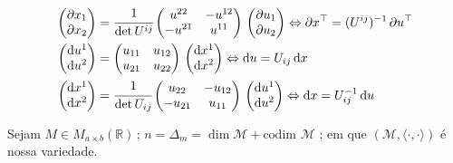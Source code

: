 \documentclass[12pt]{article}
\begin{document}
\begin{align}
  \left( \begin{matrix} \partial x_1 \\ \partial x_2 \end{matrix} \right) &= \cfrac{1}{\det U^{ij}} \left( \begin{matrix} u^{22} & -u^{12} \\ -u^{21} & u^{11} \end{matrix} \right) \, \left( \begin{matrix} \partial u_1 \\ \partial u_2 \end{matrix} \right) \Leftrightarrow \partial x^\top = (U^{ij})^{-1} \, \partial u^\top \\
  \left( \begin{matrix} \mathrm{d} u^1 \\ \mathrm{d} u^2 \end{matrix} \right) &= \left( \begin{matrix} u_{11} & u_{12} \\ u_{21} & u_{22} \end{matrix} \right) \, \left( \begin{matrix} \mathrm{d} x^1 \\ \mathrm{d} x^2 \end{matrix} \right) \Leftrightarrow \mathrm{d} u = U_{ij} \, \mathrm{d} x \\
  \left( \begin{matrix} \mathrm{d} x^1 \\ \mathrm{d} x^2 \end{matrix} \right) &= \cfrac{1}{\det U_{ij}} \left( \begin{matrix} u_{22} & -u_{12} \\ -u_{21} & u_{11} \end{matrix} \right) \, \left( \begin{matrix} \mathrm{d} u^1 \\ \mathrm{d} u^2 \end{matrix} \right) \Leftrightarrow \mathrm{d} x = U_{ij}^{-1} \, \mathrm{d} u
\end{align}

Sejam $M \in M_{a \times b}(\mathbb{R})\,;\,n = \Delta_m = \dim \mathcal{M} + \text{codim } \mathcal{M}\text{ ; em que }(\mathcal{M}, \langle \cdot, \cdot \rangle)$ \'e nossa variedade.
\end{document}

